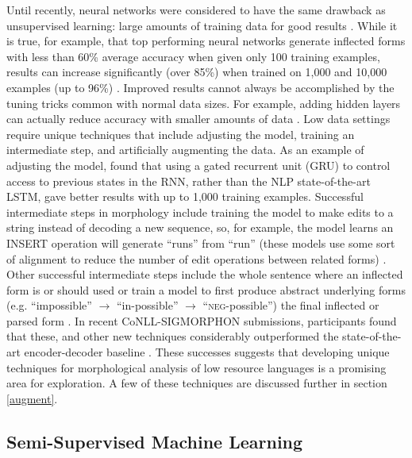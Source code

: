 \documentclass[12pt]{article}
\begin{document}
Until recently, neural networks were considered to have the same drawback as unsupervised learning: large amounts of training data for good results \cite{cotterell_conllsigmorphon_2018}. While it is true, for example, that top performing neural networks generate inflected forms with less than 60\% average accuracy when given only 100 training examples, results can increase significantly (over 85\%) when trained on 1,000 and 10,000 examples (up to 96\%) \cite{cotterell_sigmorphon_2016,cotterell_conll-sigmorphon_2017,cotterell_conllsigmorphon_2018}. Improved results cannot always be accomplished by the tuning tricks common with normal data sizes. For example, adding hidden layers can actually reduce accuracy with smaller amounts of data \cite{cotterell_conll-sigmorphon_2017}. Low data settings require unique techniques that include adjusting the model, training an intermediate step, and artificially augmenting the data. As an example of adjusting the model,  found that using a gated recurrent unit (GRU) to control access to previous states in the RNN, rather than the NLP state-of-the-art LSTM, gave better results with up to 1,000 training examples. Successful intermediate steps in morphology include training the model to make edits to a string instead of decoding a new sequence, so, for example, the model learns an INSERT operation will generate ``runs'' from ``run''  (these models use some sort of alignment to reduce the number of edit operations between related forms) \cite{makarov_align_2017,makarov_uzh_2018}. Other successful intermediate steps include the whole sentence where an inflected form is or should used or train a model to first produce abstract underlying forms (e.g. ``impossible'' $\rightarrow$ ``in-possible'' $\rightarrow$ ``\textsc{neg}-possible'') the final inflected or parsed form \cite{liu_morphological_2018,moeller_improving_2019}. In recent CoNLL-SIGMORPHON submissions, participants found that these, and other new techniques considerably outperformed the state-of-the-art encoder-decoder baseline \cite{bergmanis_training_2017}. These successes suggests that developing unique techniques for morphological analysis of low resource languages is a promising area for exploration. A few of these techniques are discussed further in section \ref{augment}. 

\subsection{Semi-Supervised Machine Learning}
\label{semi-supervised}
\end{document}
